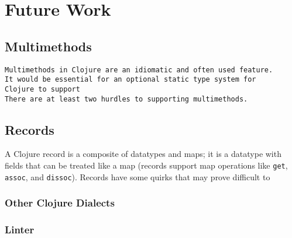 \chapter{Future Work}

\section{Multimethods}
\label{sec:mmfuture}

\begin{verbatim}
Multimethods in Clojure are an idiomatic and often used feature.
It would be essential for an optional static type system for
Clojure to support
There are at least two hurdles to supporting multimethods.
\end{verbatim}


\section{Records}

A Clojure record is a composite of datatypes and maps; it is a datatype
with fields that can be treated like a map (records support map operations like \lstinline|get|,
\lstinline|assoc|, and \lstinline|dissoc|).
Records have some quirks that may prove difficult to 

\subsection{Other Clojure Dialects}

\subsection{Linter}
